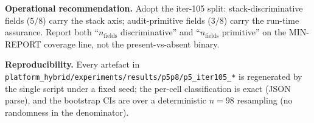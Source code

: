 \textbf{Operational recommendation.} Adopt the iter-105 split:
stack-discriminative fields ($5/8$) carry the stack axis; audit-primitive
fields ($3/8$) carry the run-time assurance. Report both
``$n_{\text{fields}}$ discriminative'' and ``$n_{\text{fields}}$
primitive'' on the MIN-REPORT coverage line, not the present-vs-absent
binary.

\textbf{Reproducibility.} Every artefact in
\texttt{platform_hybrid/experiments/results/p5p8/p5\_iter105\_*} is regenerated by the
single script under a fixed seed; the per-cell classification is exact
(JSON parse), and the bootstrap CIs are over a deterministic $n{=}98$
resampling (no randomness in the denominator).
